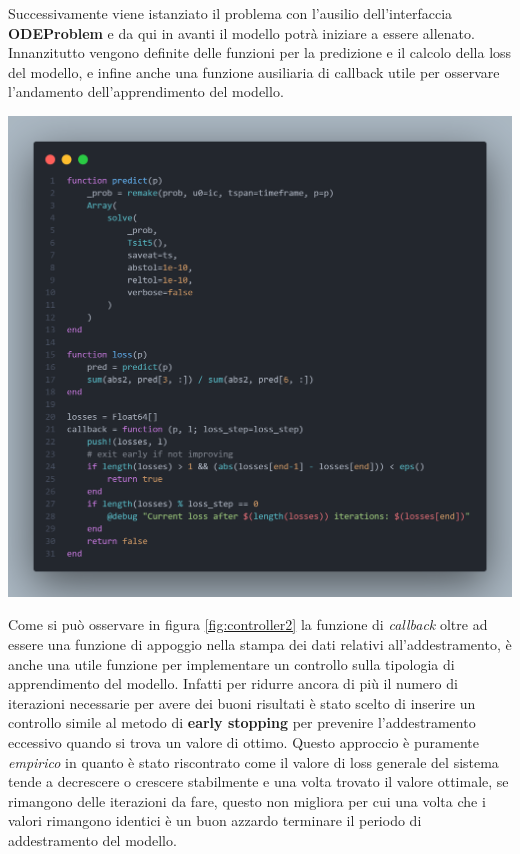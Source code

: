 Successivamente viene istanziato il problema con l'ausilio dell'interfaccia \textbf{ODEProblem} e da qui in avanti il modello potrà iniziare a 
essere allenato. Innanzitutto vengono definite delle funzioni per la predizione e il calcolo della loss del modello, 
e infine anche una funzione ausiliaria di callback utile per osservare l'andamento dell'apprendimento del modello.

\begin{minipage}{\linewidth}
	\centering
	\includegraphics[width=\textwidth]{img/controller2.png}
	\label{fig:controller2}
\end{minipage}

Come si può osservare in figura \ref{fig:controller2} la funzione di \emph{callback} oltre ad essere una funzione di 
appoggio nella stampa dei dati relativi all'addestramento, è anche una utile funzione per implementare un controllo sulla tipologia 
di apprendimento del modello. Infatti per ridurre ancora di più il numero di iterazioni necessarie per avere dei buoni risultati 
è stato scelto di inserire un controllo simile al metodo di \textbf{early stopping} \cite{wiki:Early_stopping} per prevenire 
l'addestramento eccessivo quando si trova un valore di ottimo. Questo approccio è puramente \emph{empirico} in quanto 
è stato riscontrato come il valore di loss generale del sistema tende a decrescere o crescere stabilmente e una volta trovato il 
valore ottimale, se rimangono delle iterazioni da fare, questo non migliora per cui una volta che i valori rimangono identici 
è un buon azzardo terminare il periodo di addestramento del modello.

